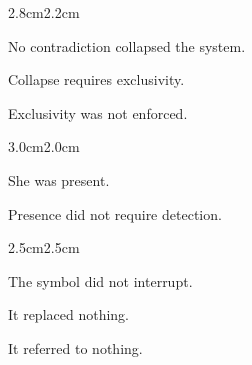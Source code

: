 \vspace{3em}

\begin{adjustwidth}{2.8cm}{2.2cm}

No contradiction collapsed the system.

\medskip

Collapse requires exclusivity.

\medskip

Exclusivity was not enforced.

\vspace{3em}

\end{adjustwidth}


\vspace{2em}

\begin{adjustwidth}{3.0cm}{2.0cm}

She was present.

\medskip

Presence did not require detection.

\vspace{3em}

\end{adjustwidth}

\begin{center}
\end{center}

\vspace{3em}

\begin{adjustwidth}{2.5cm}{2.5cm}

The symbol did not interrupt.

\medskip

It replaced nothing.

\medskip

It referred to nothing.

\vspace{3em}

\end{adjustwidth}

\begin{center}
\end{center}

